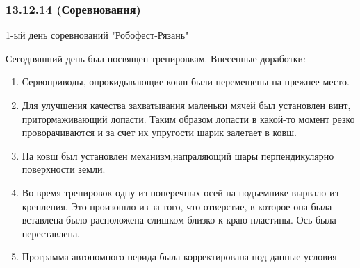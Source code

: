\subsubsection{13.12.14 (Соревнования)}
\begin{center}
	1-ый день соревнований "Робофест-Рязань"
\end{center}
Сегодняшний день был посвящен тренировкам.
Внесенные доработки:
\begin{enumerate}
	\item Сервоприводы, опрокидывающие ковш были перемещены на прежнее место. 
	
	\item Для улучшения качества захватывания маленьки мячей был установлен винт, притормаживающий лопасти. Таким образом лопасти в какой-то момент резко проворачиваются и за счет их упругости шарик залетает в ковш.
	
	\item На ковш был установлен механизм,напраляющий шары перпендикулярно поверхности земли.
	
	\item Во время тренировок одну из поперечных осей на подъемнике вырвало из крепления. Это произошло из-за того, что отверстие, в которое она была вставлена было расположена слишком близко к краю пластины. Ось была переставлена.
	
    \item Программа автономного перида была корректирована под данные условия
	
\end{enumerate}
\fillpage